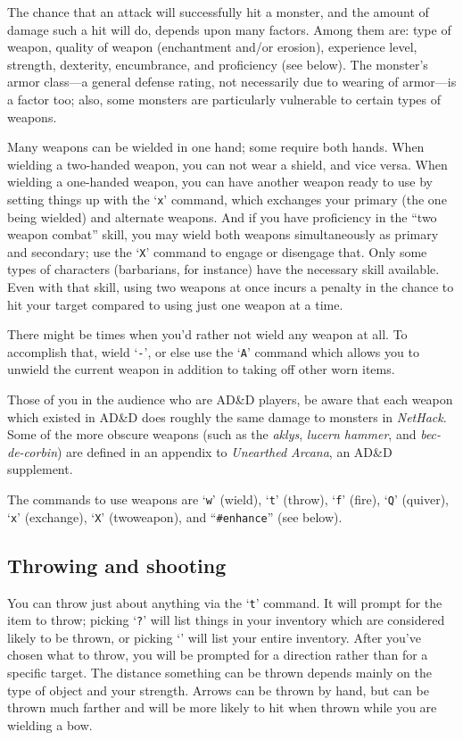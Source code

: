 The chance that an attack will successfully hit a monster, and the amount
of damage such a hit will do, depends upon many factors.  Among them are:
type of weapon, quality of weapon (enchantment and/or erosion), experience
level, strength, dexterity, encumbrance, and proficiency (see below).  The
monster's armor
class---a general defense rating, not necessarily due to wearing of armor---is
a factor too; also, some monsters are particularly
vulnerable to certain types of weapons.

Many weapons can be wielded in one hand; some require both hands.
When wielding a two-handed weapon, you can not wear a shield, and
vice versa.  When wielding a one-handed weapon, you can have another
weapon ready to use by setting things up with the `{\tt x}' command, which
exchanges your primary (the one being wielded) and alternate weapons.
And if you have proficiency in the ``two weapon combat'' skill, you
may wield both weapons simultaneously as primary and secondary; use the
`{\tt X}' command to engage or disengage that.
Only some types of characters (barbarians, for instance) have the necessary
skill available.  Even with that skill, using two weapons at once incurs
a penalty in the chance to hit your target compared to using just one
weapon at a time.

There might be times when you'd rather not wield any weapon at all.
To accomplish that, wield `{\tt -}', or else use the `{\tt A}' command which
allows you to unwield the current weapon in addition to taking off
other worn items.

Those of you in the audience who are AD\&D players, be aware that each
weapon which existed in AD\&D does roughly the same damage to monsters in
{\it NetHack}.  Some of the more obscure weapons (such as the
{\it aklys}, {\it lucern hammer}, and {\it bec-de-corbin\/}) are defined
in an appendix to {\it Unearthed Arcana}, an AD\&D supplement.

The commands to use weapons are `{\tt w}' (wield), `{\tt t}' (throw),
`{\tt f}' (fire), `{\tt Q}' (quiver),
`{\tt x}' (exchange), `{\tt X}' (twoweapon), and ``{\tt \#enhance}''
(see below).

\subsection*{Throwing and shooting}

You can throw just about anything via the `{\tt t}' command.  It will prompt
for the item to throw; picking `{\tt ?}' will list things in your inventory
which are considered likely to be thrown, or picking `{\tt *}' will list
your entire inventory.  After you've chosen what to throw, you will
be prompted for a direction rather than for a specific target.  The
distance something can be thrown depends mainly on the type of object
and your strength.  Arrows can be thrown by hand, but can be thrown
much farther and will be more likely to hit when thrown while you are
wielding a bow.

